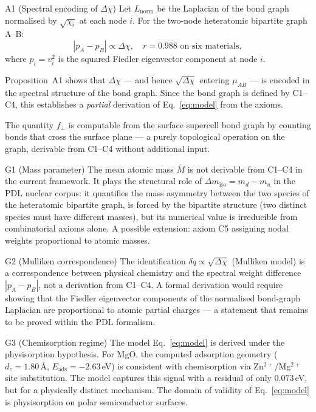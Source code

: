 \documentclass[11pt,a4paper]{article}
\newcommand{\Eads}{E_{\mathrm{ads}}}
\newcommand{\Mmoy}{\bar{M}}
\newcommand{\DeltaEN}{\Delta\chi}
\newcommand{\muAB}{\mu_{AB}}
\newcommand{\fracZ}{f_{\perp}}
\begin{document}
\begin{proposition}{A1 (Spectral encoding of $\DeltaEN$)}
Let $L_{\mathrm{norm}}$ be the Laplacian of the bond graph normalised by $\sqrt{\chi_i}$ at each node $i$. For the two-node heteratomic bipartite graph A--B:
\begin{equation}
|p_A - p_B| \propto \DeltaEN, \quad r = 0.988 \text{ on six materials},
\end{equation}
where $p_i = v_i^2$ is the squared Fiedler eigenvector component at node $i$.
\end{proposition}

Proposition~A1 shows that $\DeltaEN$ — and hence $\sqrt{\DeltaEN}$ entering $\muAB$ — is encoded in the spectral structure of the bond graph. Since the bond graph is defined by C1--C4, this establishes a \emph{partial} derivation of Eq.~\eqref{eq:model} from the axioms.

The quantity $\fracZ$ is computable from the surface supercell bond graph by counting bonds that cross the surface plane — a purely topological operation on the graph, derivable from C1--C4 without additional input.

\begin{openproblem}{G1 (Mass parameter)}
The mean atomic mass $\Mmoy$ is not derivable from C1--C4 in the current framework. It plays the structural role of $\Delta m_{\mathrm{iso}} = m_d - m_u$ in the PDL nuclear corpus: it quantifies the mass asymmetry between the two species of the heteratomic bipartite graph, is forced by the bipartite structure (two distinct species must have different masses), but its numerical value is irreducible from combinatorial axioms alone. A possible extension: axiom C5 assigning nodal weights proportional to atomic masses.
\end{openproblem}

\begin{openproblem}{G2 (Mulliken correspondence)}
The identification $\delta q \propto \sqrt{\DeltaEN}$ (Mulliken model) is a correspondence between physical chemistry and the spectral weight difference $|p_A - p_B|$, not a derivation from C1--C4. A formal derivation would require showing that the Fiedler eigenvector components of the normalised bond-graph Laplacian are proportional to atomic partial charges — a statement that remains to be proved within the PDL formalism.
\end{openproblem}

\begin{openproblem}{G3 (Chemisorption regime)}
The model Eq.~\eqref{eq:model} is derived under the physisorption hypothesis. For MgO, the computed adsorption geometry ($d_z = 1.80$\,\AA, $\Eads = -2.63$\,eV) is consistent with chemisorption via Zn$^{2+}$/Mg$^{2+}$ site substitution. The model captures this signal with a residual of only $0.073$\,eV, but for a physically distinct mechanism. The domain of validity of Eq.~\eqref{eq:model} is physisorption on polar semiconductor surfaces.
\end{openproblem}
\end{document}
